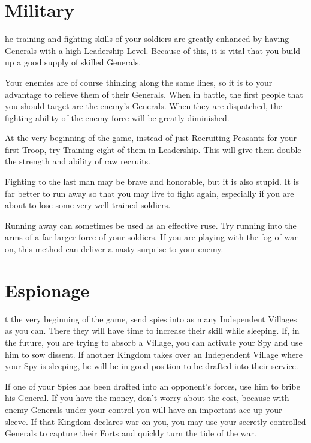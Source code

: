 \section{\textsf{Military}}


he training and fighting skills of your soldiers are greatly enhanced by having Generals with a high Leadership Level. Because of this, it is vital that you build up a good supply of skilled Generals.


Your enemies are of course thinking along the same lines, so it is to your advantage to relieve them of their Generals. When in battle, the first people that you should target are the enemy’s Generals. When they are dispatched, the fighting ability of the enemy force will be greatly diminished.

At the very beginning of the game, instead of just Recruiting Peasants for your first Troop, try Training eight of them in Leadership. This will give them double the strength and ability of raw recruits.


Fighting to the last man may be brave and honorable, but it is also stupid. It is far better to run away so that you may live to fight again, especially if you are about to lose some very well-trained soldiers.

Running away can sometimes be used as an effective ruse. Try running into the arms of a far larger force of your soldiers. If you are playing with the fog of war on, this method can deliver a nasty surprise to your enemy.

\section{\textsf{Espionage}}


t the very beginning of the game, send spies into as many Independent Villages as you can. There they will have time to increase their skill while sleeping. If, in the future, you are trying to absorb a Village, you can activate your Spy and use him to sow dissent. If another Kingdom takes over an Independent Village where your Spy is sleeping, he will be in good position to be drafted into their service.

If one of your Spies has been drafted into an opponent’s forces, use him to bribe his General. If you have the money, don’t worry about the cost, because with enemy Generals under your control you will have an important ace up your sleeve. If that Kingdom declares war on you, you may use your secretly controlled Generals to capture their Forts and quickly turn the tide of the war.

